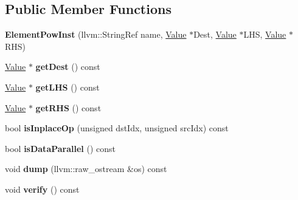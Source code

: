 \subsection*{Public Member Functions}
\begin{DoxyCompactItemize}
\item 
\mbox{\label{classglow_1_1_element_pow_inst_a814bfee26f985a6f057b401ee017b7ca}} 
{\bfseries Element\+Pow\+Inst} (llvm\+::\+String\+Ref name, \hyperlink{classglow_1_1_value}{Value} $\ast$Dest, \hyperlink{classglow_1_1_value}{Value} $\ast$L\+HS, \hyperlink{classglow_1_1_value}{Value} $\ast$R\+HS)
\item 
\mbox{\label{classglow_1_1_element_pow_inst_aefa92856bc7f378846289af377a4b862}} 
\hyperlink{classglow_1_1_value}{Value} $\ast$ {\bfseries get\+Dest} () const
\item 
\mbox{\label{classglow_1_1_element_pow_inst_ab56705ed8bb426fe3a2f5b2d1875f4c1}} 
\hyperlink{classglow_1_1_value}{Value} $\ast$ {\bfseries get\+L\+HS} () const
\item 
\mbox{\label{classglow_1_1_element_pow_inst_a6f802ac5993d6a0e37a1ed97c4aefc2b}} 
\hyperlink{classglow_1_1_value}{Value} $\ast$ {\bfseries get\+R\+HS} () const
\item 
\mbox{\label{classglow_1_1_element_pow_inst_a89ba53757428389b4079faba90ac9cea}} 
bool {\bfseries is\+Inplace\+Op} (unsigned dst\+Idx, unsigned src\+Idx) const
\item 
\mbox{\label{classglow_1_1_element_pow_inst_a7e0ecab693db743a77f58427e4b4fcb6}} 
bool {\bfseries is\+Data\+Parallel} () const
\item 
\mbox{\label{classglow_1_1_element_pow_inst_ad1297fe43ed796a9f7d6068a7098c193}} 
void {\bfseries dump} (llvm\+::raw\+\_\+ostream \&os) const
\item 
\mbox{\label{classglow_1_1_element_pow_inst_af9eb8ec7d3dea2fa23c4ba5f203fb9e5}} 
void {\bfseries verify} () const
\end{DoxyCompactItemize}
